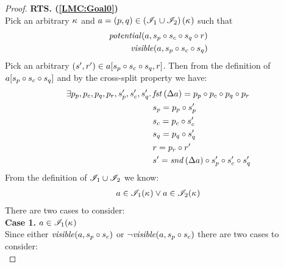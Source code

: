 \begin{lemma}
\begin{proof}
\noindent\textbf{RTS. (\ref{LMC:Goal0})}\\
Pick an arbitrary $\kappa_{}$ and $a = (p, q) \in \left(\mathscr{I}_{1} \cup \mathscr{I}_{2} \right)(\kappa_{})$ such that
\begin{align}
	\mathit{potential}(a, s_p \circ s_c \circ s_q \circ r) \label{LMC:Ass3}\\
	\mathit{visible}(a, s_p \circ s_c \circ s_q) \label{LMC:visible-pcq}
\end{align}
%
Pick an arbitrary $(s', r') \in a[s_p \circ s_c \circ s_q, r]$. Then from the definition of $a[s_p \circ s_c \circ s_q]$ and by the cross-split property we have:
%
\begin{align}
	\exists p_p, p_c, p_q, p_r, s_p', s_c', s_q'.\, & \mathit{fst}\left(\Delta {a}\right) = p_p \circ p_c \circ p_q \circ p_r \label{LMC:Ass4}\\
	& s_p = p_p \circ s_p' \label{LMC:Ass5}\\
	& s_c = p_c \circ s_c' \label{LMC:Ass6}\\
	& s_q = p_q \circ s_q' \label{LMC:Ass7}\\
	& r = p_r \circ r' \label{LMC:Ass8}\\
	& s' = \mathit{snd}\left(\Delta {a}\right) \circ s_p' \circ s_c' \circ s_q' \label{LMC:Ass9}
\end{align}
%
From the definition of $\mathscr{I}_{1} \cup \mathscr{I}_{2}$ we know:
%
\begin{align}
	a \in \mathscr{I}_{1}(\kappa_{}) \lor a \in \mathscr{I}_{2}(\kappa_{}) \nonumber
\end{align}
There are two cases to consider:\\

\noindent\textbf{Case 1.} $a \in \mathscr{I}_{1}(\kappa_{})$\\
%
Since either $\mathit{visible}(a, s_p \circ s_c)$ or $\neg\mathit{visible}(a, s_p \circ s_c)$ there are two cases to consider:\\


\end{proof}
\end{lemma}
